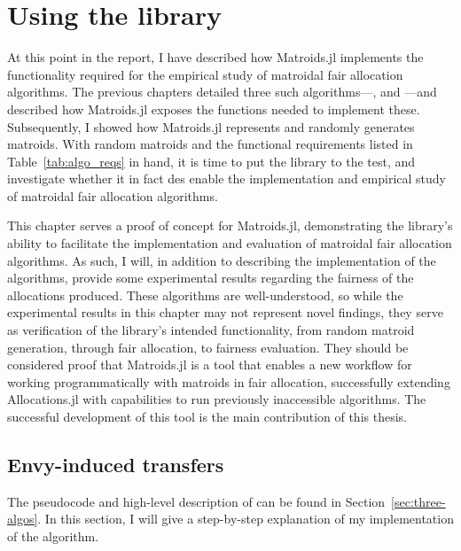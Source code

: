 \chapter{Using the library}
\label{chap:yankee-swap}
At this point in the report, I have described how Matroids.jl implements the functionality required for the empirical study of matroidal fair allocation algorithms. The previous chapters detailed three such algorithms---,  and ---and described how Matroids.jl exposes the functions needed to implement these. Subsequently, I showed how Matroids.jl represents and randomly generates matroids. With random matroids and the functional requirements listed in Table~\ref{tab:algo_reqs} in hand, it is time to put the library to the test, and investigate whether it in fact des enable the implementation and empirical study of matroidal fair allocation algorithms.

This chapter serves a proof of concept for Matroids.jl, demonstrating the library's ability to facilitate the implementation and evaluation of matroidal fair allocation algorithms. As such, I will, in addition to describing the implementation of the algorithms, provide some experimental results regarding the fairness of the allocations produced. These algorithms are well-understood, so while the experimental results in this chapter may not represent novel findings, they serve as verification of the library's intended functionality, from random matroid generation, through fair allocation, to fairness evaluation. They should be considered proof that Matroids.jl is a tool that enables a new workflow for working programmatically with matroids in fair allocation, successfully extending Allocations.jl with capabilities to run previously inaccessible algorithms. The successful development of this tool is the main contribution of this thesis.

\section{Envy-induced transfers}
The pseudocode and high-level description of  can be found in Section~\ref{sec:three-algos}. In this section, I will give a step-by-step explanation of my implementation of the algorithm.

